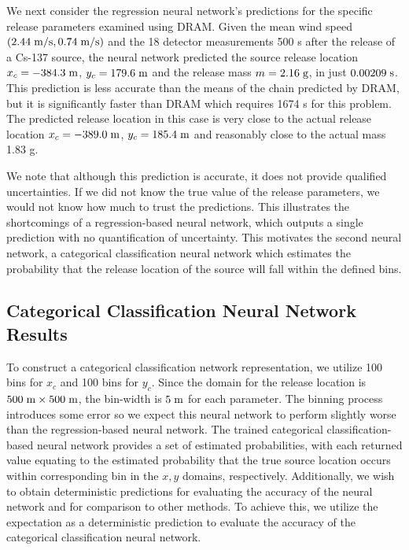 \documentclass[sn-mathphys-ay]{sn-jnl}
\begin{document}
We next consider the regression neural network's predictions for the specific release parameters examined using DRAM. Given the mean wind speed $(2.44 \hspace{1mm} \text{m/s},0.74 \hspace{1mm} \text{m/s})$ and the 18 detector measurements 500 s after the release of a Cs-137 source, the neural network predicted the source release location $x_c=-384.3 \hspace{1mm} \text{m}$, $y_c=179.6 \hspace{1mm} \text{m}$ and the release mass $m=2.16 \hspace{1mm} \text{g}$, in just $0.00209 \hspace{1mm} \text{s}$. This prediction is less accurate than the means of the chain predicted by DRAM, but it is significantly faster than DRAM which requires 1674 s for this problem. The predicted release location in this case is very close to the actual release location $x_c=-389.0 \hspace{1mm} \text{m}$, $y_c=185.4 \hspace{1mm} \text{m}$ and reasonably close to the actual mass 1.83 g. 
 
We note that although this prediction is accurate, it does not provide qualified uncertainties. If we did not know the true value of the release parameters, we would not know how much to trust the predictions. This illustrates the shortcomings of a regression-based neural network, which outputs a single prediction with no quantification of uncertainty. This motivates the second neural network, a categorical classification neural network which estimates the probability that the release location of the source will fall within the defined bins.

 \subsection{Categorical Classification Neural Network Results}
 To construct a categorical classification network representation, we utilize 100 bins for $x_c$ and 100 bins for $y_c$. Since the domain for the release location is $500 \hspace{1mm} \text{m} \times 500 \hspace{1mm} \text{m}$, the bin-width is $5 \hspace{1mm} \text{m}$ for each parameter. The binning process introduces some error so we expect this neural network to perform slightly worse than the regression-based neural network. The trained categorical classification-based neural network provides a set of estimated probabilities, with each returned value equating to the estimated probability that the true source location occurs within corresponding bin in the $x,y$ domains, respectively. Additionally, we wish to obtain deterministic predictions for evaluating the accuracy of the neural network and for comparison to other methods. To achieve this, we utilize the expectation as a deterministic prediction to evaluate the accuracy of the categorical classification neural network. 
 
\end{document}
